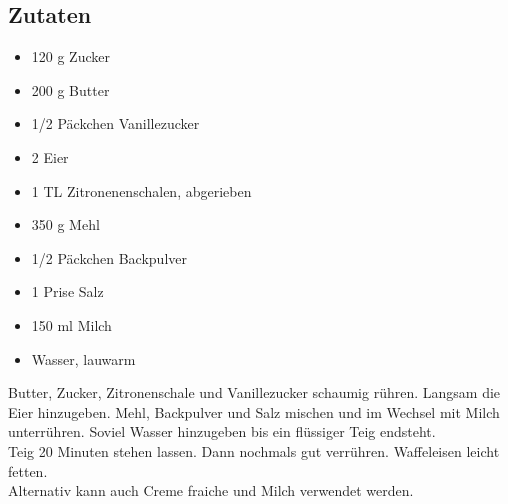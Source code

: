 \documentclass{article}
\begin{document}
\subsection*{Zutaten} %
\label{sub:zutaten}
	\begin{itemize}
		\item 120 g Zucker
		\item 200 g Butter
		\item 1/2 Päckchen Vanillezucker
		\item 2 Eier
		\item 1 TL Zitronenenschalen, abgerieben
		\item 350 g Mehl
		\item 1/2 Päckchen Backpulver
		\item 1 Prise Salz
		\item 150 ml Milch
		\item Wasser, lauwarm
	\end{itemize}
	Butter, Zucker, Zitronenschale und Vanillezucker schaumig rühren.
	Langsam die Eier hinzugeben. Mehl, Backpulver und Salz mischen und im Wechsel mit Milch 
	unterrühren. Soviel Wasser hinzugeben bis ein flüssiger Teig endsteht.\\
	Teig 20 Minuten stehen lassen. Dann nochmals gut verrühren. Waffeleisen leicht fetten.\\

	Alternativ kann auch Creme fraiche und Milch verwendet werden.
\end{document}
